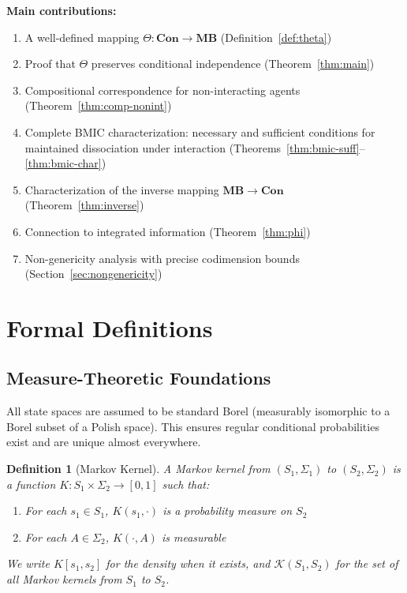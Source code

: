 \documentclass[11pt,a4paper]{article}
\newtheorem{definition}[theorem]{Definition}
\newcommand{\Con}{\mathbf{Con}}
\newcommand{\MB}{\mathbf{MB}}
\newcommand{\Kern}{\mathcal{K}}
\begin{document}
\textbf{Main contributions:}
\begin{enumerate}[nosep]
    \item A well-defined mapping $\Theta : \Con \to \MB$ (Definition~\ref{def:theta})
    \item Proof that $\Theta$ preserves conditional independence (Theorem~\ref{thm:main})
    \item Compositional correspondence for non-interacting agents (Theorem~\ref{thm:comp-nonint})
    \item Complete BMIC characterization: necessary and sufficient conditions for maintained dissociation under interaction (Theorems~\ref{thm:bmic-suff}--\ref{thm:bmic-char})
    \item Characterization of the inverse mapping $\MB \to \Con$ (Theorem~\ref{thm:inverse})
    \item Connection to integrated information (Theorem~\ref{thm:phi})
    \item Non-genericity analysis with precise codimension bounds (Section~\ref{sec:nongenericity})
\end{enumerate}

\section{Formal Definitions}

\subsection{Measure-Theoretic Foundations}

All state spaces are assumed to be standard Borel (measurably isomorphic to a Borel subset of a Polish space). This ensures regular conditional probabilities exist and are unique almost everywhere.

\begin{definition}[Markov Kernel]\label{def:kernel}
A \emph{Markov kernel} from $(S_1, \Sigma_1)$ to $(S_2, \Sigma_2)$ is a function $K : S_1 \times \Sigma_2 \to [0,1]$ such that:
\begin{enumerate}[nosep]
    \item For each $s_1 \in S_1$, $K(s_1, \cdot)$ is a probability measure on $S_2$
    \item For each $A \in \Sigma_2$, $K(\cdot, A)$ is measurable
\end{enumerate}
We write $K[s_1, s_2]$ for the density when it exists, and $\Kern(S_1, S_2)$ for the set of all Markov kernels from $S_1$ to $S_2$.
\end{definition}
\end{document}
